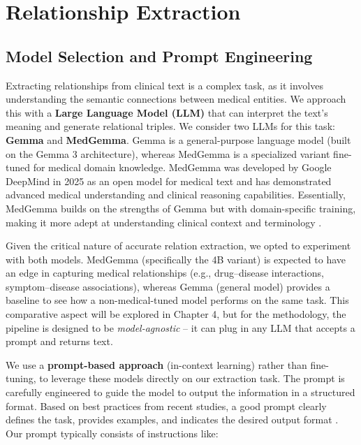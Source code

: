 \section{Relationship Extraction}
\label{sec:relationextraction}

\subsection{Model Selection and Prompt Engineering}

Extracting relationships from clinical text is a complex task, as it involves understanding the semantic connections between medical entities. We approach this with a \textbf{Large Language Model (LLM)} that can interpret the text's meaning and generate relational triples. We consider two LLMs for this task: \textbf{Gemma} and \textbf{MedGemma}. Gemma is a general-purpose language model (built on the Gemma 3 architecture), whereas MedGemma is a specialized variant fine-tuned for medical domain knowledge. MedGemma was developed by Google DeepMind in 2025 as an open model for medical text and has demonstrated advanced medical understanding and clinical reasoning capabilities. Essentially, MedGemma builds on the strengths of Gemma but with domain-specific training, making it more adept at understanding clinical context and terminology \parencite{MedGemma2025,Gemma2025}.

Given the critical nature of accurate relation extraction, we opted to experiment with both models. MedGemma (specifically the 4B variant) is expected to have an edge in capturing medical relationships (e.g., drug–disease interactions, symptom–disease associations), whereas Gemma (general model) provides a baseline to see how a non-medical-tuned model performs on the same task. This comparative aspect will be explored in Chapter 4, but for the methodology, the pipeline is designed to be \textit{model-agnostic} – it can plug in any LLM that accepts a prompt and returns text.

We use a \textbf{prompt-based approach} (in-context learning) rather than fine-tuning, to leverage these models directly on our extraction task. The prompt is carefully engineered to guide the model to output the information in a structured format. Based on best practices from recent studies, a good prompt clearly defines the task, provides examples, and indicates the desired output format \parencite{Reynolds2021}. Our prompt typically consists of instructions like:

